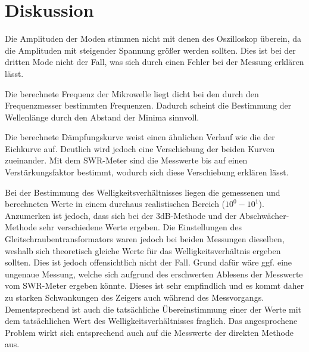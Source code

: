 \section{Diskussion}
\label{sec:Diskussion}
Die Amplituden der Moden stimmen nicht mit denen des Oszilloskop überein, da die
Amplituden mit steigender Spannung größer werden sollten. Dies ist bei der
dritten Mode nicht der Fall, was sich durch einen Fehler bei der Messung erklären lässt.

Die berechnete Frequenz der Mikrowelle liegt dicht bei den durch den Frequenzmesser
bestimmten Frequenzen. Dadurch scheint die Bestimmung der Wellenlänge durch den Abstand der Minima
sinnvoll.

Die berechnete Dämpfungskurve weist einen ähnlichen Verlauf wie die der Eichkurve auf.
Deutlich wird jedoch eine Verschiebung der beiden Kurven zueinander. Mit dem
SWR-Meter sind die Messwerte bis auf einen Verstärkungsfaktor bestimmt, wodurch sich diese
Verschiebung erklären lässt.


Bei der Bestimmung des Welligkeitsverhältnisses liegen die gemessenen und berechneten
Werte in einem durchaus realistischen Bereich ($10^0 - 10^1$). Anzumerken ist jedoch,
dass sich bei der 3dB-Methode und der Abschwächer-Methode sehr verschiedene Werte
ergeben. Die Einstellungen des Gleitschraubentransformators waren jedoch bei beiden
Messungen dieselben, weshalb sich theoretisch gleiche Werte für das Welligkeitsverhältnis
ergeben sollten. Dies ist jedoch offensichtlich nicht der Fall. Grund dafür wäre ggf.
eine ungenaue Messung, welche sich aufgrund des erschwerten Ablesens der
Messwerte vom SWR-Meter ergeben könnte. Dieses ist sehr empfindlich und es kommt
daher zu starken Schwankungen des Zeigers auch während des Messvorgangs.
Dementsprechend ist auch die tatsächliche Übereinstimmung einer der Werte mit
dem tatsächlichen Wert des Welligkeitsverhältnisses fraglich. Das angesprochene
Problem wirkt sich entsprechend auch auf die Messwerte der direkten Methode aus.
